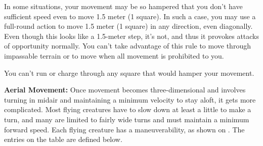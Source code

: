 In some situations, your movement may be so hampered that you don't have sufficient speed even to move 1.5 meter (1 square). In such a case, you may use a full-round action to move 1.5 meter (1 square) in any direction, even diagonally. Even though this looks like a 1.5-meter step, it's not, and thus it provokes attacks of opportunity normally. You can't take advantage of this rule to move through impassable terrain or to move when all movement is prohibited to you.

You can't run or charge through any square that would hamper your movement.

\textbf{Aerial Movement:} Once movement becomes three-dimensional and involves turning in midair and maintaining a minimum velocity to stay aloft, it gets more complicated. Most flying creatures have to slow down at least a little to make a turn, and many are limited to fairly wide turns and must maintain a minimum forward speed. Each flying creature has a maneuverability, as shown on . The entries on the table are defined below.


